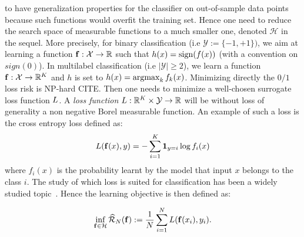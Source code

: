 to have generalization properties for the classifier on out-of-sample data points because such functions would overfit the training set. Hence one need to reduce the search space of measurable functions to a much smaller one, denoted $\mathcal{H}$ in the sequel. More precisely, for binary classification (i.e $\mathcal{Y}:=\{-1,+1\})$, we aim at learning a function $\mathbf{f}:\mathcal{X}\to\mathbb{R}$ such that $h(x)=\operatorname*{sign}(f(x))$ (with a convention on $sign(0)$). In multilabel classification (i.e $|\mathcal{Y}|\geq2$), we learn a function $\mathbf{f}:\mathcal{X}\to\mathbb{R}^K$ and $h$ is set to $h(x)=\operatorname*{argmax}_k f_k(x)$. Minimizing directly the $0/1$ loss risk is  NP-hard CITE. Then one needs to minimize a well-chosen surrogate loss function $L$. A \textit{loss function} $L:\mathbb{R}^K\times\mathcal{Y}\to\mathbb{R}$ will be without loss of generality a non negative Borel measurable function. An example of such a loss is the cross entropy loss defined as:
\begin{align*}
    L(\mathbf{f}(x),y)=-\sum_{i=1}^K \mathbf{1}_{y=i}\log f_i(x)
\end{align*}
where $f_i(x)$ is the probability learnt by the model that input $x$ belongs to the class $i$. The study of which loss is suited for classification has been a widely studied topic~\citep{bartlett2006convexity,steinwart2007compare}. Hence the learning objective is then defined as:

\begin{align*}
\inf_{\mathbf{f}\in\mathcal{H}}\widehat{\mathcal{R}}_{N}(\mathbf{f}):= \frac{1}{N}\sum_{i=1}^N L(\mathbf{f}(x_i),y_i).
\end{align*}



